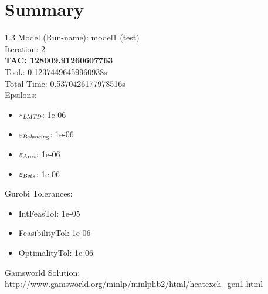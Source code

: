 \documentclass{article}%
\begin{document}
%
\normalsize%
\section{Summary}%
\thispagestyle{plain}%
\begin{spacing}{1.3}%
\Large%
Model (Run-name): model1 (test)\\%
Iteration: 2\\%
\textbf{TAC: 128009.91260607763}\\%
Took: 0.12374496459960938s\\%
Total Time: 0.5370426177978516s\\%
Epsilons:%
\begin{itemize}%
	\item $\varepsilon_{\textsl{LMTD}}$: 1e-06%
	\item $\varepsilon_{\textsl{Balancing}}$: 1e-06%
	\item $\varepsilon_{\textsl{Area}}$: 1e-06%
	\item $\varepsilon_{\textsl{Beta}}$: 1e-06%
\end{itemize}%
Gurobi Tolerances:%
\begin{itemize}%
	\item IntFeasTol: 1e-05%
	\item FeasibilityTol: 1e-06%
	\item OptimalityTol: 1e-06%
\end{itemize}%
\end{spacing}%
\normalsize%
Gamsworld Solution: \url{http://www.gamsworld.org/minlp/minlplib2/html/heatexch_gen1.html}%
%
\clearpage%
\end{document}

